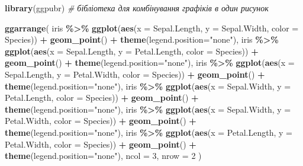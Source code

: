 \documentclass[
  11pt,
]{book}
\newenvironment{Shaded}{\begin{snugshade}}{\end{snugshade}}
\newcommand{\AttributeTok}[1]{\textcolor[rgb]{0.13,0.29,0.53}{#1}}
\newcommand{\CommentTok}[1]{\textcolor[rgb]{0.56,0.35,0.01}{\textit{#1}}}
\newcommand{\DecValTok}[1]{\textcolor[rgb]{0.00,0.00,0.81}{#1}}
\newcommand{\FunctionTok}[1]{\textcolor[rgb]{0.13,0.29,0.53}{\textbf{#1}}}
\newcommand{\NormalTok}[1]{#1}
\newcommand{\SpecialCharTok}[1]{\textcolor[rgb]{0.81,0.36,0.00}{\textbf{#1}}}
\newcommand{\StringTok}[1]{\textcolor[rgb]{0.31,0.60,0.02}{#1}}
\begin{document}
\begin{Shaded}
\begin{Highlighting}[]
\FunctionTok{library}\NormalTok{(ggpubr) }\CommentTok{\# бібліотека для комбінування графіків в один рисунок}

\FunctionTok{ggarrange}\NormalTok{(}
\NormalTok{  iris }\SpecialCharTok{\%\textgreater{}\%}
    \FunctionTok{ggplot}\NormalTok{(}\FunctionTok{aes}\NormalTok{(}\AttributeTok{x =}\NormalTok{ Sepal.Length, }\AttributeTok{y =}\NormalTok{ Sepal.Width, }\AttributeTok{color =}\NormalTok{ Species)) }\SpecialCharTok{+}
    \FunctionTok{geom\_point}\NormalTok{() }\SpecialCharTok{+} \FunctionTok{theme}\NormalTok{(}\AttributeTok{legend.position=}\StringTok{"none"}\NormalTok{),}
\NormalTok{  iris }\SpecialCharTok{\%\textgreater{}\%}
    \FunctionTok{ggplot}\NormalTok{(}\FunctionTok{aes}\NormalTok{(}\AttributeTok{x =}\NormalTok{ Sepal.Length, }\AttributeTok{y =}\NormalTok{ Petal.Length, }\AttributeTok{color =}\NormalTok{ Species)) }\SpecialCharTok{+}
    \FunctionTok{geom\_point}\NormalTok{() }\SpecialCharTok{+} \FunctionTok{theme}\NormalTok{(}\AttributeTok{legend.position=}\StringTok{"none"}\NormalTok{),}
\NormalTok{  iris }\SpecialCharTok{\%\textgreater{}\%}
    \FunctionTok{ggplot}\NormalTok{(}\FunctionTok{aes}\NormalTok{(}\AttributeTok{x =}\NormalTok{ Sepal.Length, }\AttributeTok{y =}\NormalTok{ Petal.Width, }\AttributeTok{color =}\NormalTok{ Species)) }\SpecialCharTok{+}
    \FunctionTok{geom\_point}\NormalTok{() }\SpecialCharTok{+} \FunctionTok{theme}\NormalTok{(}\AttributeTok{legend.position=}\StringTok{"none"}\NormalTok{),}
\NormalTok{  iris }\SpecialCharTok{\%\textgreater{}\%}
    \FunctionTok{ggplot}\NormalTok{(}\FunctionTok{aes}\NormalTok{(}\AttributeTok{x =}\NormalTok{ Sepal.Width, }\AttributeTok{y =}\NormalTok{ Petal.Length, }\AttributeTok{color =}\NormalTok{ Species)) }\SpecialCharTok{+}
    \FunctionTok{geom\_point}\NormalTok{() }\SpecialCharTok{+} \FunctionTok{theme}\NormalTok{(}\AttributeTok{legend.position=}\StringTok{"none"}\NormalTok{),}
\NormalTok{  iris }\SpecialCharTok{\%\textgreater{}\%}
    \FunctionTok{ggplot}\NormalTok{(}\FunctionTok{aes}\NormalTok{(}\AttributeTok{x =}\NormalTok{ Sepal.Width, }\AttributeTok{y =}\NormalTok{ Petal.Width, }\AttributeTok{color =}\NormalTok{ Species)) }\SpecialCharTok{+}
    \FunctionTok{geom\_point}\NormalTok{() }\SpecialCharTok{+} \FunctionTok{theme}\NormalTok{(}\AttributeTok{legend.position=}\StringTok{"none"}\NormalTok{),}
\NormalTok{  iris }\SpecialCharTok{\%\textgreater{}\%}
    \FunctionTok{ggplot}\NormalTok{(}\FunctionTok{aes}\NormalTok{(}\AttributeTok{x =}\NormalTok{ Petal.Length, }\AttributeTok{y =}\NormalTok{ Petal.Width, }\AttributeTok{color =}\NormalTok{ Species)) }\SpecialCharTok{+}
    \FunctionTok{geom\_point}\NormalTok{() }\SpecialCharTok{+} \FunctionTok{theme}\NormalTok{(}\AttributeTok{legend.position=}\StringTok{"none"}\NormalTok{),}
  \AttributeTok{ncol =} \DecValTok{3}\NormalTok{, }\AttributeTok{nrow =} \DecValTok{2}
\NormalTok{)}
\end{Highlighting}
\end{Shaded}
\end{document}
